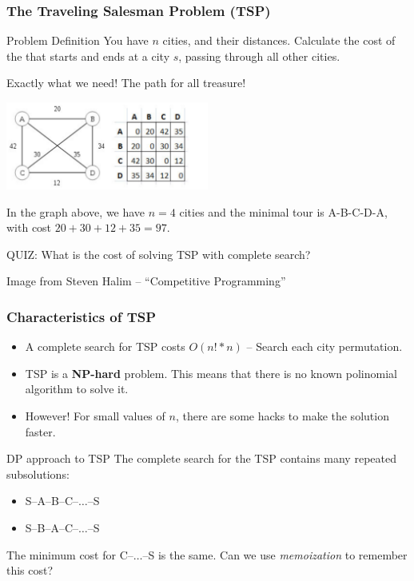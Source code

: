\begin{frame}
  \frametitle{The Traveling Salesman Problem (TSP)}

  {\smaller
    \begin{block}{Problem Definition}
      You have $n$ cities, and their distances. Calculate the cost of
      the  that starts and ends at a city $s$, passing
      through all other cities.

      \medskip

      Exactly what we need! The path for all treasure!
  \end{block}
  \begin{center}
    \includegraphics[width=0.5\textwidth]{../img/tsp_example}
  \end{center}

  In the graph above, we have $n=4$ cities and the minimal tour is
  A-B-C-D-A, with cost $20+30+12+35=97$.

  \medskip

  \alert{QUIZ:} What is the cost of solving TSP with complete search?
  }

  \hrulefill

  \hfill{\tiny Image from Steven Halim -- ``Competitive Programming''}

\end{frame}

\begin{frame}
  \frametitle{Characteristics of TSP}

  {\smaller
    \begin{block}{}
      \begin{itemize}
      \item A complete search for TSP costs $O(n!*n)$ -- \alert{Search
        each city permutation}.
      \item TSP is a {\bf NP-hard} problem. This means that there is
        no known polinomial algorithm to solve it.
      \item \alert{However!} For small values of $n$, there are some
        hacks to make the solution faster.
      \end{itemize}
    \end{block}

    \begin{exampleblock}{DP approach to TSP}
      The complete search for the TSP contains many \alert{repeated subsolutions}:
      \begin{itemize}
      \item S--A--B--C--$\ldots$--S
      \item S--B--A--C--$\ldots$--S
      \end{itemize}
      The minimum cost for C--$\ldots$--S is the same. Can we use
      \emph{memoization} to remember this cost?
    \end{exampleblock}
  }
\end{frame}


